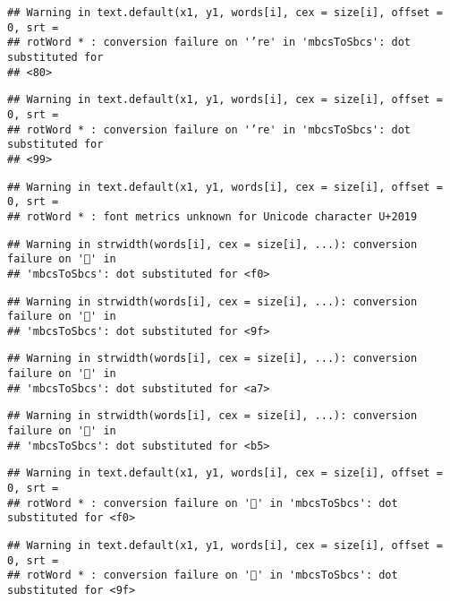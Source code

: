 \documentclass[
]{article}
\begin{document}
\begin{verbatim}
## Warning in text.default(x1, y1, words[i], cex = size[i], offset = 0, srt =
## rotWord * : conversion failure on '’re' in 'mbcsToSbcs': dot substituted for
## <80>
\end{verbatim}

\begin{verbatim}
## Warning in text.default(x1, y1, words[i], cex = size[i], offset = 0, srt =
## rotWord * : conversion failure on '’re' in 'mbcsToSbcs': dot substituted for
## <99>
\end{verbatim}

\begin{verbatim}
## Warning in text.default(x1, y1, words[i], cex = size[i], offset = 0, srt =
## rotWord * : font metrics unknown for Unicode character U+2019
\end{verbatim}

\begin{verbatim}
## Warning in strwidth(words[i], cex = size[i], ...): conversion failure on '🧵' in
## 'mbcsToSbcs': dot substituted for <f0>
\end{verbatim}

\begin{verbatim}
## Warning in strwidth(words[i], cex = size[i], ...): conversion failure on '🧵' in
## 'mbcsToSbcs': dot substituted for <9f>
\end{verbatim}

\begin{verbatim}
## Warning in strwidth(words[i], cex = size[i], ...): conversion failure on '🧵' in
## 'mbcsToSbcs': dot substituted for <a7>
\end{verbatim}

\begin{verbatim}
## Warning in strwidth(words[i], cex = size[i], ...): conversion failure on '🧵' in
## 'mbcsToSbcs': dot substituted for <b5>
\end{verbatim}

\begin{verbatim}
## Warning in text.default(x1, y1, words[i], cex = size[i], offset = 0, srt =
## rotWord * : conversion failure on '🧵' in 'mbcsToSbcs': dot substituted for <f0>
\end{verbatim}

\begin{verbatim}
## Warning in text.default(x1, y1, words[i], cex = size[i], offset = 0, srt =
## rotWord * : conversion failure on '🧵' in 'mbcsToSbcs': dot substituted for <9f>
\end{verbatim}
\end{document}
